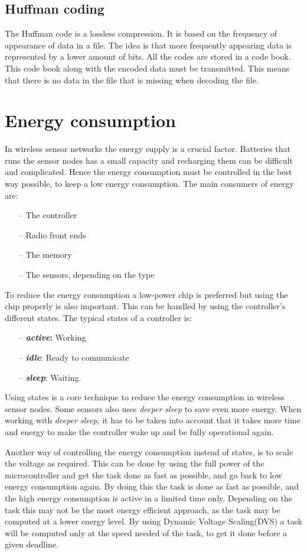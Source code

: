 \subsection{Huffman coding}
The Huffman code is a lossless compression. It is based on the frequency of appearance of data in a file. The idea is that more frequently appearing data is represented by a lower amount of bits.
All the codes are stored in a code book. This code book along with the encoded data must be transmitted. This means that there is no data in the file that is missing when decoding the file.

\section{Energy consumption}
In wireless sensor networks the energy supply is a crucial factor. Batteries that runs the sensor nodes has a small capacity and recharging them can be difficult and complicated. Hence the energy consumption must be controlled in the best way possible, to keep a low energy consumption.
The main consumers of energy are:
\begin{itemize}
	\item[--] The controller
	\item[--] Radio front ends
	\item[--] The memory
	\item[--] The sensors, depending on the type
\end{itemize}
	 
To reduce the energy consumption a low-power chip is preferred but using the chip properly is also important. This can be handled by using the controller's different states. The typical states of a controller is:
\begin{itemize}
	\item[--] \textbf{\emph{active}:} Working 
	\item[--] \textbf{\emph{idle}}: Ready to communicate 
	\item[--] \textbf{\emph{sleep}}: Waiting.
\end{itemize}

Using states is a core technique to reduce the energy consumption in wireless sensor nodes. Some sensors also uses \emph{deeper sleep} to save even more energy. When working with \emph{deeper sleep}, it has to be taken into account that it takes more time and energy to make the controller wake up and be fully operational again.

Another way of controlling the energy consumption instead of states, is to scale the voltage as required. This can be done by using the full power of the microcontroller and get the task done as fast as possible, and go back to low energy consumption again. By doing this the task is done as fast as possible, and the high energy consumption is active in a limited time only. Depending on the task this may not be the most energy efficient approach, as the task may be computed at a lower energy level. By using Dynamic Voltage Scaling(DVS) a task will be computed only at the speed needed of the task, to get it done before a given deadline.

